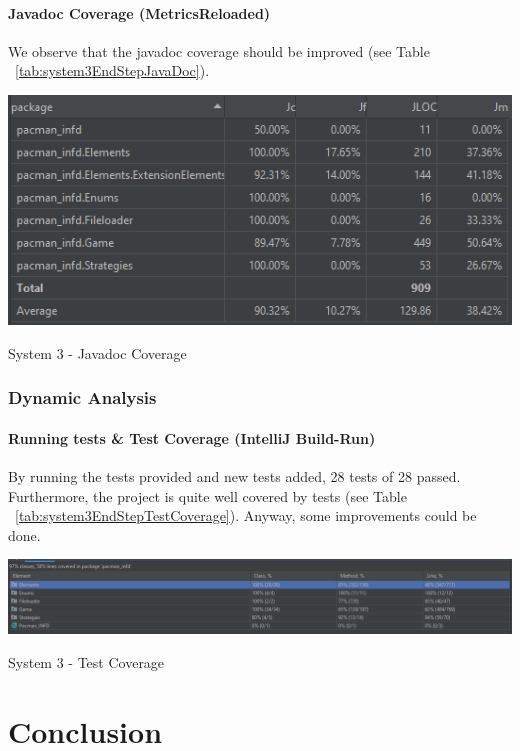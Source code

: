 \documentclass{article}
\begin{document}
\paragraph{Javadoc Coverage (MetricsReloaded)}
We observe that the javadoc coverage should be improved (see Table ~\ref{tab:system3EndStepJavaDoc}).

\begin{table}
\centering
    \includegraphics[width=\linewidth]{imgs/JavaDocCoverageS3.PNG}
    \caption{System 3 - Javadoc Coverage}
    \label{tab:system3EndStepJavaDoc}
\end{table}

\subsubsection{Dynamic Analysis}

\paragraph{Running tests \& Test Coverage (IntelliJ Build-Run)} By running the tests provided and new tests added, 28 tests of 28 passed. Furthermore, the project is quite well covered by tests (see Table ~\ref{tab:system3EndStepTestCoverage}). Anyway, some improvements could be done.

\begin{table}
\centering
    \includegraphics[width=\linewidth]{imgs/system3lastStepTestCover.PNG}
    \caption{System 3 - Test Coverage}
    \label{tab:system3EndStepTestCoverage}
\end{table}

\section{Conclusion}
\end{document}
